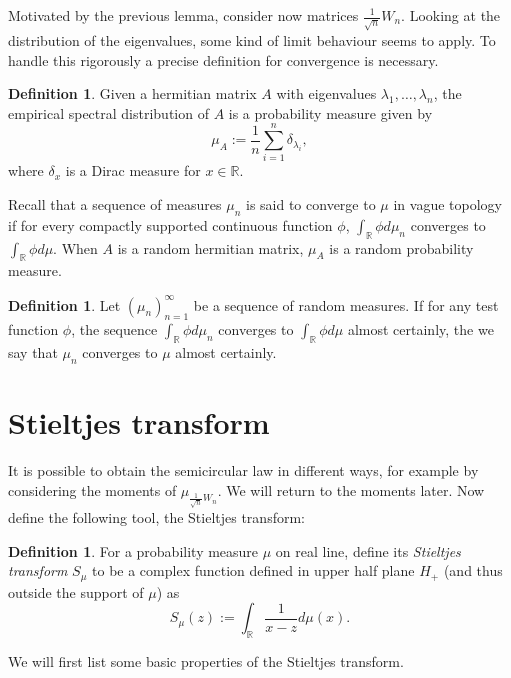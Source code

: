 \documentclass[12pt,a4paper,leqno]{report}
\newcommand{\R}{\mathbb{R}}
\theoremstyle{plain}
\theoremstyle{definition}
\newtheorem{defi}[equation]{Definition}
\theoremstyle{remark}
\begin{document}
Motivated by the previous lemma, consider now matrices $\frac{1}{\sqrt{n}}W_n$. Looking at the distribution of the eigenvalues, some kind of limit behaviour seems to apply. To handle this rigorously a precise definition for convergence is necessary.

\begin{defi}
Given a hermitian matrix $A$ with eigenvalues $\lambda_1, \ldots , \lambda_n$, the empirical spectral distribution of $A$ is a probability measure given by
\begin{equation*}
\mu_A := \frac{1}{n} \sum_{i=1}^n \delta_{\lambda_i},
\end{equation*}
where $\delta_x$ is a Dirac measure for $x \in \R$.
\end{defi}

Recall that a sequence of measures $\mu_n$ is said to converge to $\mu$ in vague topology if for every compactly supported continuous function $\phi$, $\int_{\R} \phi d\mu_n$ converges to $\int_{\R}\phi d\mu$. When $A$ is a random hermitian matrix, $\mu_A$ is a random probability measure.

\begin{defi}
Let $(\mu_n)_{n=1}^{\infty}$ be a sequence of random measures.
If for any test function $\phi$, the sequence $\int_{\R} \phi d\mu_n$ converges to $\int_{\R} \phi d\mu$ almost certainly, the we say that $\mu_n$ converges to $\mu$ almost certainly.
\end{defi}

\section{Stieltjes transform}
\label{stieltjes}


It is possible to obtain the semicircular law in different ways, for example by considering the moments of $\mu_{\frac{1}{\sqrt{n}}W_n}$. We will return to the moments later. Now define the following tool, the Stieltjes transform:

\begin{defi}
For a probability measure $\mu$ on real line, define its \emph{Stieltjes transform} $S_{\mu}$ to be a complex function defined in upper half plane $H_+$ (and thus outside the support of $\mu$) as
\begin{equation*}
S_{\mu} (z) := \int_{\R} \frac{1}{x-z} d \mu(x).
\end{equation*}
\end{defi}

We will first list some basic properties of the Stieltjes transform.
\end{document}
